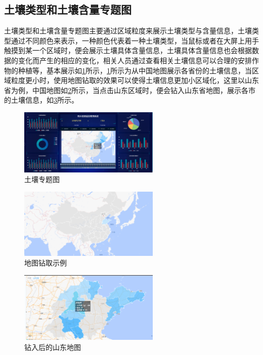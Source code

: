 \subsection{土壤类型和土壤含量专题图}
土壤类型和土壤含量专题图主要通过区域粒度来展示土壤类型与含量信息，土壤类型通过不同颜色来表示，一种颜色代表着一种土壤类型，当鼠标或者在大屏上用手触摸到某一个区域时，便会展示土壤具体含量信息，土壤具体含量信息也会根据数据的变化而产生的相应的变化，相关人员通过查看相关土壤信息可以合理的安排作物的种植等，基本展示如\ref{fig:turang}所示，\ref{fig:turang}所示为从中国地图展示各省份的土壤信息，当区域粒度更小时，使用地图钻取的效果可以使得土壤信息更加小区域化，这里以山东省为例，中国地图如\ref{fig:zuanqu}所示，当点击山东区域时，便会钻入山东省地图，展示各市的土壤信息，如\ref{fig:shandong}所示。
\begin{figure}[!htb]%
	\centering
	\includegraphics[width=0.60\textwidth]{figs/turang.png}
	\caption{土壤专题图}
	\label{fig:turang}
\end{figure}
\begin{figure}[!htb]%
	\centering
	\includegraphics[width=0.60\textwidth]{figs/shili.png}
	\caption{地图钻取示例}
	\label{fig:zuanqu}
\end{figure}
\begin{figure}[!htb]%
	\centering
	\includegraphics[width=0.60\textwidth]{figs/shandong.png}
	\caption{钻入后的山东地图}
	\label{fig:shandong}
\end{figure}

